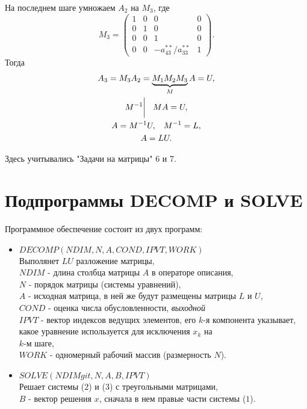 \documentclass[a4paper,11pt]{article}
\begin{document}
На последнем шаге умножаем $A_2$ на $M_3$, где
\begin{equation*}
  M_3 =
  \begin{pmatrix}
    1 & 0 & 0 & 0 \\
    0 & 1 & 0 & 0 \\
    0 & 0 & 1 & 0 \\
    0 & 0 & -a_{43}^{**}/a_{33}^{**} & 1
  \end{pmatrix}.
\end{equation*}
Тогда
\begin{gather*}
  A_3 = M_3A_2 = \underbrace{M_1M_2M_3}_{M}A = U, \\
  M^{-1} \bigg| \hspace{3mm} MA=U, \\
  A = M^{-1}U, \hspace{3mm} M^{-1} = L, \\
  A = LU.
\end{gather*}
\begin{flushright}
  \footnotesize Здесь учитывались "Задачи на матрицы" 6 и 7.
\end{flushright}

\section{Подпрограммы DECOMP и SOLVE}
Программное обеспечение состоит из двух программ:
\begin{itemize}
  \item $DECOMP(NDIM, N, A, COND, IPVT, WORK)$ \\
    Выполянет $LU$ разложение матрицы, \vspace{2mm} \\
    $NDIM$ - длина столбца матрицы $A$ в операторе описания, \\
    $N$ - порядок матрицы (системы уравнений), \\
    $A$ - исходная матрица, в ней же будут размещены матрицы $L$ и $U$, \\
    $COND$ - оценка числа обусловленности, \textit{выходной}\\
    $IPVT$ - вектор индексов ведущих элементов, его $k$-я компонента указывает, какое уравнение используется для исключения $x_k$ на \\ $k$-м шаге, \\
    $WORK$ - одномерный рабочий массив (размерность $N$).
  \item $SOLVE(NDIMgit , N, A, B, IPVT)$ \\
    Решает системы ($2$) и ($3$) с треугольными матрицами, \\
    $B$ - вектор решения $x$, сначала в нем правые части системы ($1$).
\end{itemize}
\end{document}
